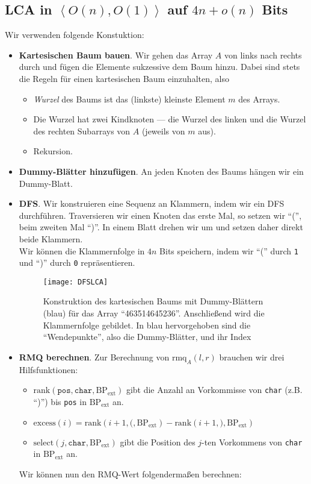 \subsection{LCA in \( \left\langle O(n),O(1) \right\rangle \) auf \( 4n+o(n) \) Bits}

Wir verwenden folgende Konstuktion:

\begin{itemize}
  \item \textbf{Kartesischen Baum bauen}. \quad Wir gehen das Array \( A \) von links nach rechts durch und fügen die Elemente sukzessive dem Baum hinzu. Dabei sind stets die Regeln für einen kartesischen Baum einzuhalten, also
  \begin{itemize}
    \item \emph{Wurzel} des Baums ist das (linkste) kleinste Element \( m \) des Arrays.
    \item Die Wurzel hat zwei Kindknoten --- die Wurzel des linken und die Wurzel des rechten Subarrays von \( A \) (jeweils von \( m \) aus).
    \item Rekursion.
  \end{itemize}
  \item \textbf{Dummy-Blätter hinzufügen}. \quad An jeden Knoten des Baums hängen wir ein Dummy-Blatt.
  \item \textbf{DFS}. \quad Wir konstruieren eine Sequenz an Klammern, indem wir ein DFS durchführen. Traversieren wir einen Knoten das erste Mal, so setzen wir ``('', beim zweiten Mal ``)''. In einem Blatt drehen wir um und setzen daher direkt beide Klammern. \\

  Wir können die Klammernfolge in \( 4n \) Bits speichern, indem wir ``('' durch \texttt{1} und ``)'' durch \texttt{0} repräsentieren.

  \begin{figure}[H]
    \texttt{[image: DFSLCA]}
    \caption{Konstruktion des kartesischen Baums mit Dummy-Blättern (blau) für das Array ``463514645236''. Anschließend wird die Klammernfolge gebildet. In blau hervorgehoben sind die ``Wendepunkte'', also die Dummy-Blätter, und ihr Index}
  \end{figure}

  \item \textbf{RMQ berechnen}. \quad Zur Berechnung von \( \text{rmq}_A(l,r) \) brauchen wir drei Hilfsfunktionen:
  \begin{itemize}
    \item \( \text{rank}(\texttt{pos}, \texttt{char}, \text{BP}_{\text{ext}}) \) gibt die Anzahl an Vorkommisse von \texttt{char} (z.B. ``)'') bis \texttt{pos} in \( \text{BP}_{\text{ext}} \) an.
    \item \( \text{excess}(i) = \text{rank}(i+1, \texttt{(}, \text{BP}_{\text{ext}}) - \text{rank}(i+1, \texttt{)}, \text{BP}_{\text{ext}}) \)
    \item \( \text{select}(j, \texttt{char}, \text{BP}_{\text{ext}}) \) gibt die Position des \( j \)-ten Vorkommens von \texttt{char} in \( \text{BP}_{\text{ext}} \) an.
  \end{itemize}
  Wir können nun den RMQ-Wert folgendermaßen berechnen:


\end{itemize}

